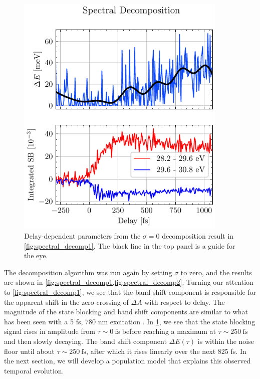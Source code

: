 \begin{figure}
	\centering
	\includegraphics[width=0.9\textwidth]{figures/chap4/spectral_decomp2.pdf}
	\caption{Delay-dependent parameters from the $\sigma=0$ decomposition result in \cref{fig:spectral_decomp1}. The black line in the top panel is a guide for the eye.}
	\label{fig:spectral_decomp2}
\end{figure}

The decomposition algorithm was run again by setting $\sigma$ to zero, and the results are shown in \cref{fig:spectral_decomp1,fig:spectral_decomp2}. Turning our attention to \cref{fig:spectral_decomp1}, we see that the band shift component is responsible for the apparent shift in the zero-crossing of $\Delta A$ with respect to delay. The magnitude of the state blocking and band shift components are similar to what has been seen with a 5 fs, 780 nm excitation \cite{zurchDirectSimultaneousObservation2017}. In \cref{fig:spectral_decomp2}, we see that the state blocking signal rises in amplitude from $\tau \sim 0 \ \textrm{fs}$ before reaching a maximum at $\tau \sim 250 \ \textrm{fs}$ and then slowly decaying. The band shift component $\Delta E(\tau)$ is within the noise floor until about $\tau \sim 250 \ \textrm{fs}$, after which it rises linearly over the next 825 fs. In the next section, we will develop a population model that explains this observed temporal evolution.

